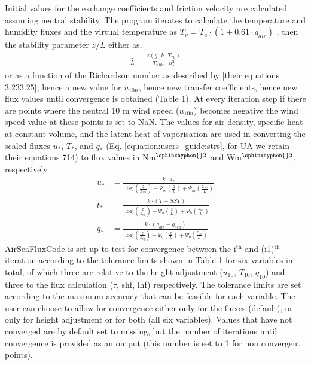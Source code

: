 \documentclass[letterpaper,10pt,english]{sphinxmanual}
\begin{document}
\sphinxAtStartPar
Initial values for the exchange coefficients and friction velocity are calculated assuming neutral stability. The program iterates to calculate the temperature and humidity fluxes and the virtual temperature as \(T_{v} =T_{a} \cdot (1 + 0.61 \cdot q_{air})\) , then the stability parameter \(z/L\) either as,
\begin{equation}\label{equation:users_guide:zol}
\begin{split}\frac{z}{L}=\frac{z(g \cdot k \cdot T_{*v})}{T_{v10n} \cdot u_{*}^{2}}\end{split}
\end{equation}
\sphinxAtStartPar
or  as a function of the Richardson number as described by  {[}their equations 3.23\textendash{}3.25{]}; hence a new value for \(u_{10n}\), hence new transfer coefficients, hence new flux values until convergence is obtained (Table 1).  At every iteration step if there are points where the neutral 10 m wind speed (\(u_{10n}\)) becomes negative the wind speed value at these points is set to NaN.
The values for air density, specific heat at constant volume, and the latent heat of vaporisation are used in converting the scaled fluxes \(u_{*}\), \(T_{*}\), and \(q_{*}\) (Eq. \ref{equation:users_guide:strs}, for UA we retain their equations 7\sphinxhyphen{}14) to flux values in Nm$^{\text{\sphinxhyphen{}2}}$ and Wm$^{\text{\sphinxhyphen{}2}}$, respectively.
\begin{equation}\label{equation:users_guide:strs}
\begin{split}  u_{\ast} &= \frac{k\cdot u_{z}}{\log(\frac{z}{z_{om}})-\Psi_{m}(\frac{z}{L})+\Psi_{m}(\frac{z_{om}}{L})} \\
  t_{\ast} &= \frac{k\cdot (T-SST)}{\log(\frac{z}{z_{oh}})-\Psi_{h}(\frac{z}{L})+\Psi_{h}(\frac{z_{oh}}{L})} \\
  q_{\ast} &= \frac{k\cdot (q_{air}-q_{sea})}{\log(\frac{z}{z_{oq}})-\Psi_{q}(\frac{z}{L})+\Psi_{q}(\frac{z_{oq}}{L})}\end{split}
\end{equation}
\sphinxAtStartPar
AirSeaFluxCode is set up to test for convergence between the i$^{\text{th}}$ and (i\sphinxhyphen{}1)$^{\text{th}}$ iteration according to the tolerance limits shown in Table 1 for six variables in total, of which three are relative to the height adjustment (\(u_{10}\), \(T_{10}\), \(q_{10}\)) and three to the flux calculation (\(\tau\), shf, lhf) respectively. The tolerance limits are set according to the maximum accuracy that can be feasible for each variable. The user can choose to allow for convergence either only for the fluxes (default), or only for height adjustment or for both (all six variables). Values that have not converged are by default set to missing, but the number of iterations until convergence is provided as an output (this number is set to \sphinxhyphen{}1 for non convergent points).
\end{document}
